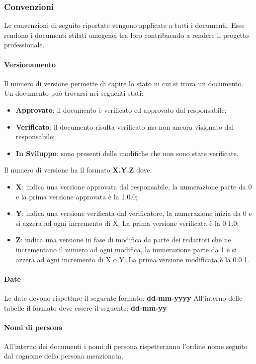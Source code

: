 \subsubsection{Convenzioni}
Le convenzioni di seguito riportate vengono applicate a tutti i documenti.
Esse rendono i documenti stilati omogenei tra loro contribuendo a rendere il progetto professionale.

\paragraph{Versionamento}
Il numero di versione permette di capire lo stato in cui si trova un documento.
Un documento può trovarsi nei seguenti stati:
\begin{itemize} 
    \item \textbf{Approvato}: il documento è verificato ed approvato dal responsabile;
    \item \textbf{Verificato}: il documento risulta verificato ma non ancora visionato dal responsabile;
    \item \textbf{In Sviluppo}: sono presenti delle modifiche che non sono state verificate.
\end{itemize}
Il numero di versione ha il formato \textbf{X.Y.Z} dove:
\begin{itemize} 
    \item \textbf{X}: indica una versione approvata dal responsabile, la numerazione parte da 0
    e la prima versione approvata è la 1.0.0;
    \item \textbf{Y}: indica una versione verificata dal verificatore, la numerazione inizia da 0 e si azzera ad ogni incremento di X. La prima versione
    verificata è la 0.1.0;
    \item \textbf{Z}: indica una versione in fase di modifica da parte dei redattori che ne incrementano il numero ad ogni modifica,
    la numerazione parte da 1 e si azzera ad ogni incremento di X o Y. La prima versione modificata è la 0.0.1.
\end{itemize}

\paragraph{Date}
Le date devono rispettare il seguente formato: \textbf{dd-mm-yyyy}
All'interno delle tabelle il formato deve essere il seguente: \textbf{dd-mm-yy}
\paragraph{Nomi di persona}
All'interno dei documenti i nomi di persona rispetteranno l'ordine nome seguito dal cognome della persona menzionata.

